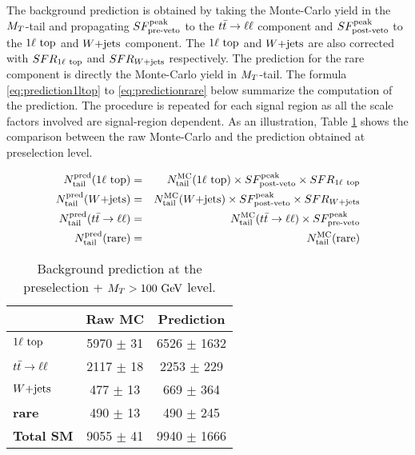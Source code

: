         The background prediction is obtained by taking the Monte-Carlo yield in the 
        $M_T$-tail and propagating $SF_{\text{pre-veto}}^{\text{peak}}$ to the $t\bar{t} \rightarrow \ell \ell$ component and $SF_{\text{post-veto}}^{\text{peak}}$ 
        to the $1\ell~\text{top}$ and $\text{$W$+jets}$ component. The $1\ell~\text{top}$ and $\text{$W$+jets}$ 
        are also corrected with $SFR_{1\ell~\text{top}}$ and $SFR_{\text{$W$+jets}}$ respectively. The 
        prediction for the rare component is directly the Monte-Carlo yield in $M_T$-tail. 
        The formula \ref{eq:prediction1ltop} to \ref{eq:predictionrare} below summarize 
        the computation of the prediction. The procedure is repeated for each signal 
        region as all the scale factors involved are signal-region dependent. As an 
        illustration, Table \ref{tab:predictionPreselection} shows the comparison between 
        the raw Monte-Carlo and the prediction obtained at preselection level.

        \begin{eqnarray}
            N^\text{pred}_\text{tail}(1\ell~\text{top}) & = & N^\text{MC}_\text{tail}(1\ell~\text{top})  \times SF_{\text{post-veto}}^{\text{peak}} \times SFR_{1\ell~\text{top}} \label{eq:prediction1ltop}  \\
            N^\text{pred}_\text{tail}(\text{$W$+jets})        & = & N^\text{MC}_\text{tail}(\text{$W$+jets})         \times SF_{\text{post-veto}}^{\text{peak}}  \times SFR_{\text{$W$+jets}}                             \\
            N^\text{pred}_\text{tail}(t\bar{t} \rightarrow \ell \ell)  & = & N^\text{MC}_\text{tail}(t\bar{t} \rightarrow \ell \ell)   \times SF_{\text{pre-veto}}^{\text{peak}}                                                \\
            N^\text{pred}_\text{tail}(\text{rare})   & = & N^\text{MC}_\text{tail}(\text{rare})                                           \label{eq:predictionrare} 
        \end{eqnarray}

        \begin{table}[!h]
            \begin{center}
                \begin{tabular}{|l|c|c|}
                    \hline
                                             &  \textbf{Raw MC}    & \textbf{Prediction}       \\
                    \hline
                    \textbf{$1\ell~\text{top}$} &  5970 $\pm$ 31      & 6526 $\pm$ 1632     \\
                    \textbf{$t\bar{t} \rightarrow \ell \ell$}  &  2117 $\pm$ 18      & 2253 $\pm$  229     \\
                    \textbf{$\text{$W$+jets}$}        &   477 $\pm$ 13      &  669 $\pm$  364     \\
                    \textbf{rare}            &   490 $\pm$ 13      &  490 $\pm$  245     \\
                    \hline
                    \textbf{Total SM}        &  9055 $\pm$ 41      & 9940 $\pm$ 1666     \\
                    \hline
                \end{tabular}
                \caption{ Background prediction at the preselection + $M_T > 100~\text{GeV}$ level.}
                \label{tab:predictionPreselection}
            \end{center}
        \end{table}

